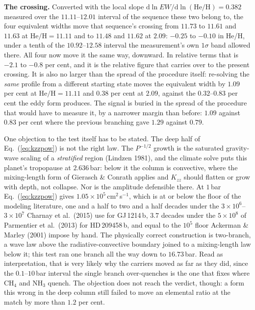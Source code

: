 \documentclass[english,a4paper]{my_memo}
\begin{document}
\medskip
\noindent\textbf{The crossing.} Converted with the local slope
$\mathrm{d}\ln EW/\mathrm{d}\ln(\mathrm{He/H}) = 0.382$ measured over the
$11.11$--$12.01$ interval of the sequence these two belong to, the four
equivalent widths move that sequence's crossing from $11.73$ to $11.61$ and
$11.63$ at $\mathrm{He/H} = 11.11$ and to $11.48$ and $11.62$ at $2.09$:
$-0.25$ to $-0.10$ in He/H, under a tenth of the $10.92$--$12.58$ interval
the measurement's own $1\sigma$ band allowed there. All four now move it the
same way, downward. In relative terms that is $-2.1$ to $-0.8$ per cent, and
it is the relative figure that carries over to the present crossing. It is
also no larger than the spread of the procedure itself: re-solving the
\emph{same} profile from a different starting state moves the equivalent
width by $1.09$ per cent at $\mathrm{He/H} = 11.11$ and $0.38$ per cent at
$2.09$, against the $0.32$--$0.83$ per cent the eddy form produces. The
signal is buried in the spread of the procedure that would have to measure
it, by a narrower margin than before: $1.09$ against $0.83$ per cent where
the previous branching gave $1.29$ against $0.79$.

\medskip
\noindent One objection to the test itself has to be stated. The deep half of
Eq.~(\ref{eq:kzzpow}) is not the right law. The $P^{-1/2}$ growth is the
saturated gravity-wave scaling of a \emph{stratified} region (Lindzen 1981),
and the climate solve puts this planet's tropopause at $2.636$\,bar: below it
the column is convective, where the mixing-length form of Gierasch \& Conrath
applies and $K_{zz}$ should flatten or grow with depth, not collapse. Nor is
the amplitude defensible there. At $1$\,bar Eq.~(\ref{eq:kzzpow}) gives
$1.05\times10^{5}$\,cm$^2$\,s$^{-1}$, which is at or below the floor of the
modeling literature, one and a half to two and a half decades under the
$3\times10^{6}$--$3\times10^{7}$ Charnay et al.\ (2015) use for GJ\,1214\,b,
$3.7$ decades under the $5\times10^{8}$ of Parmentier et al.\ (2013) for
HD\,209458\,b, and equal to the $10^{5}$ floor Ackerman \& Marley (2001)
impose by hand. The physically correct construction is two-branch, a wave law
above the radiative-convective boundary joined to a mixing-length law below
it; this test ran one branch all the way down to $16.73$\,bar. Read as
interpretation, that is very likely why the carriers moved as far as they
did, since the $0.1$--$10$\,bar interval the single branch over-quenches is
the one that fixes where CH$_4$ and NH$_3$ quench. The objection does not
reach the verdict, though: a form this wrong in the deep column still failed
to move an elemental ratio at the match by more than $1.2$ per cent.
\end{document}
